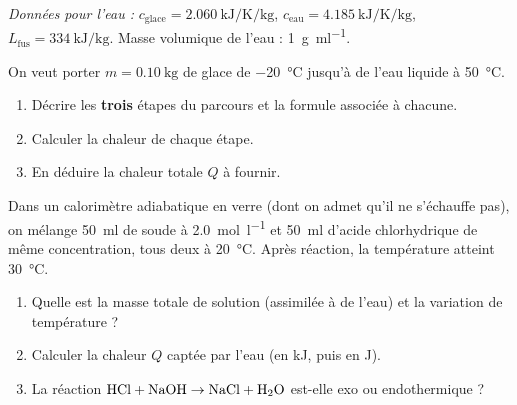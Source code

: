 \documentclass[11pt,a4paper]{article}
\begin{document}
\begin{center}
\end{center}

\textit{Données pour l'eau :} $c_{\text{glace}}=\SI{2.060}{\kilo\joule\per\kelvin\per\kilogram}$,\;
$c_{\text{eau}}=\SI{4.185}{\kilo\joule\per\kelvin\per\kilogram}$,\;
$L_{\text{fus}}=\SI{334}{\kilo\joule\per\kilogram}$. Masse volumique de l'eau : \SI{1}{\gram\per\milli\litre}.

\begin{exercice}
On veut porter $m=\SI{0.10}{\kilogram}$ de glace de \SI{-20}{\celsius} jusqu'à de l'eau liquide à \SI{50}{\celsius}.
\begin{enumerate}[label=\alph*),leftmargin=2em,topsep=2pt,itemsep=2pt]
  \item Décrire les \textbf{trois} étapes du parcours et la formule associée à chacune.
  \item Calculer la chaleur de chaque étape.
  \item En déduire la chaleur totale $Q$ à fournir.
\end{enumerate}
\end{exercice}

\begin{exercice}
Dans un calorimètre adiabatique en verre (dont on admet qu'il ne s'échauffe pas), on mélange
\SI{50}{\milli\litre} de soude  à \SI{2.0}{\mol\per\litre} et \SI{50}{\milli\litre} d'acide
chlorhydrique  de même concentration, tous deux à \SI{20}{\celsius}. Après réaction, la
température atteint \SI{30}{\celsius}.
\begin{enumerate}[label=\alph*),leftmargin=2em,topsep=2pt,itemsep=2pt]
  \item Quelle est la masse totale de solution (assimilée à de l'eau) et la variation de température ?
  \item Calculer la chaleur $Q$ captée par l'eau (en \si{\kilo\joule}, puis en \si{\joule}).
  \item La réaction $\ce{HCl}+\ce{NaOH}\rightarrow\ce{NaCl}+\ce{H2O}$ est-elle exo ou endothermique ?
\end{enumerate}
\end{exercice}
\end{document}
